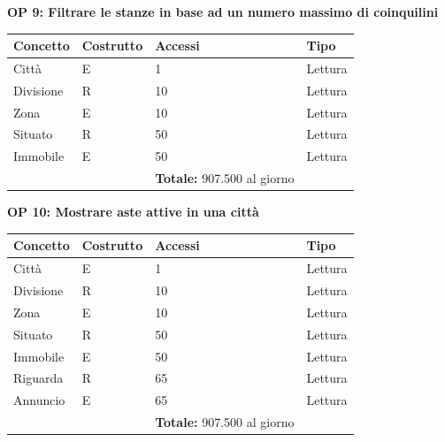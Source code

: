 \documentclass[a4paper,12pt]{report}
\begin{document}
            \textbf{OP 9: Filtrare le stanze in base ad un numero massimo di coinquilini}
        	\begin{table}[H]
            \centering
             \begin{tabular}{llll}
             \rowcolor{yellow!20} \textbf{Concetto} & \textbf{Costrutto} & \textbf{Accessi} & \textbf{Tipo}\\ [0.5ex] 
             \hline
             Città & E & 1 & Lettura \\ 
             Divisione & R & 10 & Lettura \\ 
             Zona & E & 10 & Lettura \\ 
             Situato & R & 50 & Lettura \\ 
             Immobile & E & 50 & Lettura \\ 
             \hline
                \rowcolor{yellow!20} &   & \textbf{Totale:}  907.500 al giorno &  \\ [1ex] 
             
             \end{tabular}
            \end{table}

            \textbf{OP 10: Mostrare aste attive in una città}
        	\begin{table}[H]
            \centering
             \begin{tabular}{llll}
             \rowcolor{yellow!20} \textbf{Concetto} & \textbf{Costrutto} & \textbf{Accessi} & \textbf{Tipo}\\ [0.5ex] 
             \hline
             Città & E & 1 & Lettura \\ 
             Divisione & R & 10 & Lettura \\ 
             Zona & E & 10 & Lettura \\ 
             Situato & R & 50 & Lettura \\ 
             Immobile & E & 50 & Lettura \\ 
             Riguarda & R & 65 & Lettura \\ 
             Annuncio & E & 65 & Lettura \\ 
             \hline
                \rowcolor{yellow!20} &   & \textbf{Totale:}  907.500 al giorno &  \\ [1ex] 
             
             \end{tabular}
            \end{table}
\end{document}
